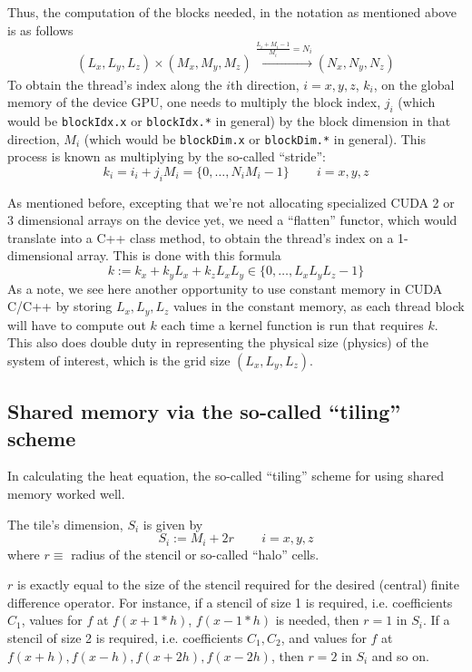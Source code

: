 \documentclass[10pt]{amsart}
\begin{document}
Thus, the computation of the blocks needed, in the notation as mentioned above is as follows
\[
\begin{gathered}
  (L_x, L_y,L_z) \times (M_x,M_y,M_z) \xrightarrow{ \frac{ L_i + M_i - 1}{ M_i} = N_i } (N_x,N_y,N_z)
  \end{gathered}
\]
To obtain the thread's index along the $i$th direction, $i=x,y,z$, $k_i$, on the global memory of the device GPU, one needs to multiply the block index, $j_i$ (which would be \verb|blockIdx.x| or \verb|blockIdx.*| in general) by the block dimension in that direction, $M_i$ (which would be \verb|blockDim.x| or \verb|blockDim.*| in general).  This process is known as multiplying by the so-called ``stride'':
\[
k_i = i_i + j_i M_i = \lbrace 0 , \dots , N_i M_i - 1 \rbrace \qquad \, i = x,y,z
\]

As mentioned before, excepting that we're not allocating specialized CUDA 2 or 3 dimensional arrays on the device yet, we need a ``flatten'' functor, which would translate into a C++ class method, to obtain the thread's index on a 1-dimensional array.  This is done with this formula
\[
k := k_x + k_y L_x + k_z L_x L_y \in \lbrace 0 , \dots , L_x L_y L_z - 1 \rbrace
\]
As a note, we see here another opportunity to use constant memory in CUDA C/C++ by storing $L_x,L_y,L_z$ values in the constant memory, as each thread block will have to compute out $k$ each time a kernel function is run that requires $k$.  This also does double duty in representing the physical size (physics) of the system of interest, which is the grid size $(L_x,L_y,L_z)$.

\subsection{Shared memory via the so-called ``tiling'' scheme}

In calculating the heat equation, the so-called ``tiling'' scheme for using shared memory worked well.

The tile's dimension, $S_i$ is given by
\[
S_i := M_i  +2r  \qquad \, i = x,y,z
\]
where $r \equiv $ radius of the stencil or so-called ``halo'' cells.  

$r$ is exactly equal to the size of the stencil required for the desired (central) finite difference operator.  For instance, if a stencil of size 1 is required, i.e. coefficients $C_1$, values for $f$ at $f(x + 1*h)$, $f(x-1*h)$ is needed, then $r=1$ in $S_i$.  If a stencil of size 2 is required, i.e. coefficients $C_1, C_2$, and values for $f$ at $f(x+h), f(x-h), f(x+2h), f(x-2h)$, then $r=2$ in $S_i$ and so on.
\end{document}
